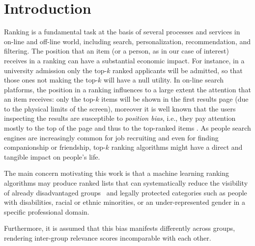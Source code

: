 \section{Introduction}\label{sec:introduction}
Ranking is a fundamental task at the basis of several processes and services in on-line and off-line world, including search, personalization, recommendation, and filtering. The position that an item (or a person, as in our case of interest) receives in a ranking can have a substantial economic impact.
For instance, in a university admission only the top-$k$ ranked applicants will be admitted, so that those ones not making the top-$k$ will have a null utility. In on-line search platforms, the position in a ranking influences to a large extent the attention that an item receives: only the top-$k$ items will be shown in the first results page (due to the physical limits of the screen), moreover it is well known that the users inspecting the results are susceptible to \emph{position bias}, i.e., they pay attention mostly to the top of the page and thus to the top-ranked items \cite{CraswellZTR08}. As people search engines are increasingly common for job recruiting and even for finding companionship or friendship, top-$k$ ranking algorithms
might have a direct and tangible impact on people's life.




%

%

%



The main concern motivating this work is that a machine learning ranking algorithms may produce ranked lists that can systematically reduce the visibility of already disadvantaged groups~\cite{peder2008,Dwork2012} and legally protected categories such as people with disabilities, racial or ethnic minorities, or an under-represented gender in a specific professional domain.

Furthermore, it is assumed that this bias manifests differently across groups, rendering inter-group relevance scores incomparable with each other.
%

